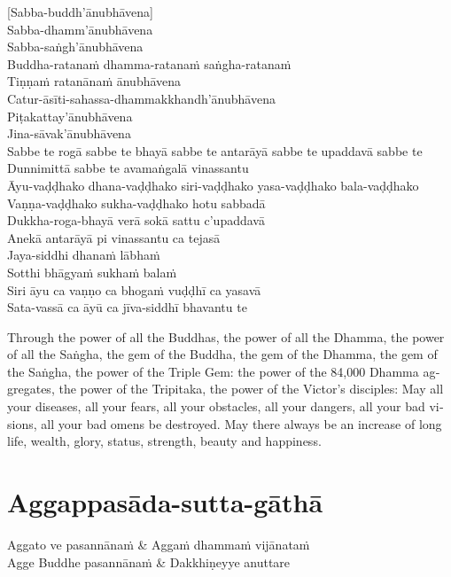 [Sabba-buddh'ānubhāvena]\\
Sabba-dhamm'ānubhāvena\\
Sabba-saṅgh'ānubhāvena\\
Buddha-ratanaṁ dhamma-ratanaṁ saṅgha-ratanaṁ\\
Tiṇṇaṁ ratanānaṁ ānubhāvena\\
Catur-āsīti-sahassa-dhammakkhandh'ānubhāvena\\
Piṭakattay'ānubhāvena\\
Jina-sāvak'ānubhāvena\\
Sabbe te rogā sabbe te bhayā sabbe te antarāyā sabbe te upaddavā sabbe te\\
Dunnimittā sabbe te avamaṅgalā vinassantu\\
Āyu-vaḍḍhako dhana-vaḍḍhako siri-vaḍḍhako yasa-vaḍḍhako bala-vaḍḍhako\\
Vaṇṇa-vaḍḍhako sukha-vaḍḍhako hotu sabbadā\\
Dukkha-roga-bhayā verā sokā sattu c'upaddavā\\
Anekā antarāyā pi vinassantu ca tejasā\\
Jaya-siddhi dhanaṁ lābhaṁ\\
Sotthi bhāgyaṁ sukhaṁ balaṁ\\
Siri āyu ca vaṇṇo ca bhogaṁ vuḍḍhī ca yasavā\\
Sata-vassā ca āyū ca jīva-siddhī bhavantu te

\begin{english}
  Through the power of all the Buddhas, the power of all the Dhamma, the power of all the Saṅgha, the gem of the Buddha, the gem of the Dhamma, the gem of the Saṅgha, the power of the Triple Gem: the power of the 84,000 Dhamma aggregates, the power of the Tripitaka, the power of the Victor’s disciples: May all your diseases, all your fears, all your obstacles, all your dangers, all your bad visions, all your bad omens be destroyed. May there always be an increase of long life, wealth, glory, status, strength, beauty and happiness.
\end{english}


\section{Aggappasāda-sutta-gāthā}

\begin{twochants}
  Aggato ve pasannānaṁ & Aggaṁ dhammaṁ vijānataṁ\\
  Agge Buddhe pasannānaṁ & Dakkhiṇeyye anuttare\\
\end{twochants}

